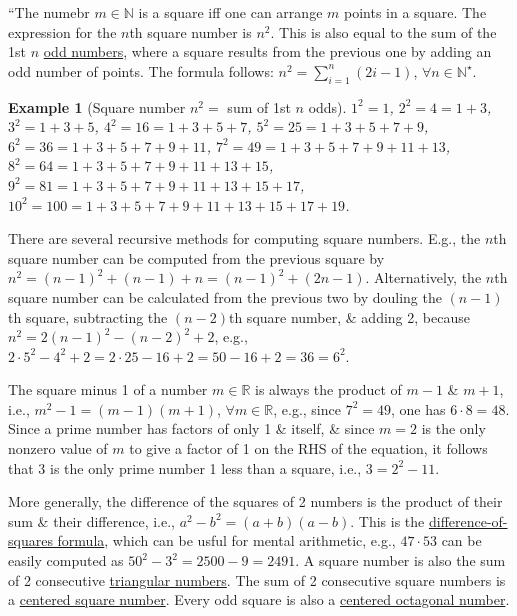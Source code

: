 \documentclass{article}
\newtheorem{example}{Example}
\begin{document}
``The numebr $m\in\mathbb{N}$ is a square iff one can arrange $m$ points in a square. The expression for the $n$th square number is $n^2$. This is also equal to the sum of the 1st $n$ \href{https://en.wikipedia.org/wiki/Parity_(mathematics)}{odd numbers}, where a square results from the previous one by adding an odd number of points. The formula follows: $n^2 = \sum_{i=1}^n (2i - 1)$, $\forall n\in\mathbb{N}^\star$.

\begin{example}[Square number $n^2 =$ sum of 1st $n$ odds]
	$1^2 = 1$, $2^2 = 4 = 1 + 3$, $3^2 = 1 + 3 + 5$, $4^2 = 16 = 1 + 3 + 5 + 7$, $5^2 = 25 = 1 + 3 + 5 + 7 + 9$, $6^2 = 36 = 1 + 3 + 5 + 7 + 9 + 11$, $7^2 = 49 = 1 + 3 + 5 + 7 + 9 + 11 + 13$, $8^2 = 64 = 1 + 3 + 5 + 7 + 9 + 11 + 13 + 15$, $9^2 = 81 = 1 + 3 + 5 + 7 + 9 + 11 + 13 + 15 + 17$, $10^2 = 100 = 1 + 3 + 5 + 7 + 9 + 11 + 13 + 15 + 17 + 19$.
\end{example}
There are several recursive methods for computing square numbers. E.g., the $n$th square number can be computed from the previous square by $n^2 = (n - 1)^2 + (n - 1) + n = (n - 1)^2 + (2n - 1)$. Alternatively, the $n$th square number can be calculated from the previous two by douling the $(n - 1)$th square, subtracting the $(n - 2)$th square number, \& adding 2, because $n^2 = 2(n - 1)^2  - (n - 2)^2 + 2$, e.g., $2\cdot5^2 - 4^2 + 2 = 2\cdot25 - 16 + 2 = 50 - 16 + 2 = 36 = 6^2$.

The square minus 1 of a number $m\in\mathbb{R}$ is always the product of $m - 1$ \& $m + 1$, i.e., $m^2 - 1 = (m - 1)(m + 1)$, $\forall m\in\mathbb{R}$, e.g., since $7^2 = 49$, one has $6\cdot8 = 48$. Since a prime number has factors of only 1 \& itself, \& since $m = 2$ is the only nonzero value of $m$ to give a factor of 1 on the RHS of the equation, it follows that $3$ is the only prime number 1 less than a square, i.e., $3 = 2^2 - 11$.

More generally, the difference of the squares of 2 numbers is the product of their sum \& their difference, i.e., $a^2 - b^2 = (a + b)(a - b)$. This is the \href{https://en.wikipedia.org/wiki/Difference_of_two_squares}{difference-of-squares formula}, which can be usful for mental arithmetic, e.g., $47\cdot53$ can be easily computed as $50^2 - 3^2 = 2500 - 9 = 2491$. A square number is also the sum of 2 consecutive \href{https://en.wikipedia.org/wiki/Triangular_number}{triangular numbers}. The sum of 2 consecutive square numbers is a \href{https://en.wikipedia.org/wiki/Centered_square_number}{centered square number}. Every odd square is also a \href{https://en.wikipedia.org/wiki/Centered_octagonal_number}{centered octagonal number}.
\end{document}
